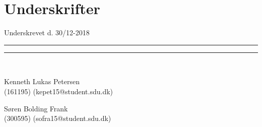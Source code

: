 
\section*{Underskrifter}
\vspace{3ex} \hfill Underskrevet d. 30/12-2018\\

\newlength{\streg} \setlength{\streg}{0.49\linewidth}

\vspace*{\fill} \rule{\streg}{1pt} \hfill \rule{\streg}{1pt}\\
\begin{minipage}[b]{\streg}
 \centering
 \rule{0pt}{4ex}
 Kenneth Lukas Petersen \\
 {\footnotesize (161195) (kepet15@student.sdu.dk)}
\end{minipage}
\hfill
\begin{minipage}[b]{\streg}
 \centering
Søren Bolding Frank \\
 {\footnotesize (300595) (sofra15@student.sdu.dk)}
\end{minipage}
\vspace*{\fill}